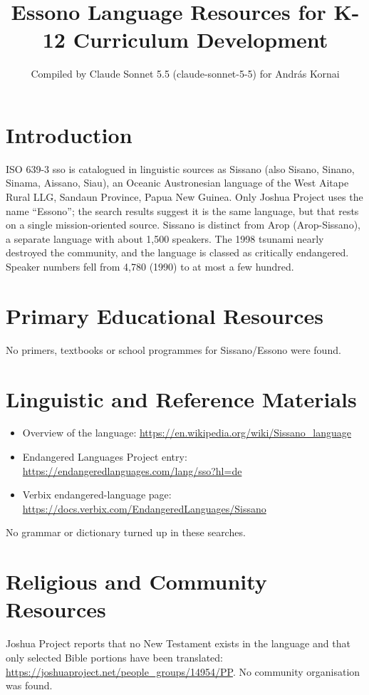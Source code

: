 \documentclass[12pt]{article}
\title{Essono Language Resources for K-12 Curriculum Development}
\author{Compiled by Claude Sonnet 5.5 (claude-sonnet-5-5) for Andr\'as Kornai}
\date{}
\begin{document}
\maketitle

\section{Introduction}
ISO 639-3 sso is catalogued in linguistic sources as Sissano (also Sisano, Sinano, Sinama, Aissano, Siau), an Oceanic Austronesian language of the West Aitape Rural LLG, Sandaun Province, Papua New Guinea. Only Joshua Project uses the name ``Essono''; the search results suggest it is the same language, but that rests on a single mission-oriented source. Sissano is distinct from Arop (Arop-Sissano), a separate language with about 1,500 speakers. The 1998 tsunami nearly destroyed the community, and the language is classed as critically endangered. Speaker numbers fell from 4,780 (1990) to at most a few hundred.

\section{Primary Educational Resources}
No primers, textbooks or school programmes for Sissano/Essono were found.

\section{Linguistic and Reference Materials}
\begin{itemize}
\item Overview of the language: \url{https://en.wikipedia.org/wiki/Sissano_language}
\item Endangered Languages Project entry: \url{https://endangeredlanguages.com/lang/sso?hl=de}
\item Verbix endangered-language page: \url{https://docs.verbix.com/EndangeredLanguages/Sissano}
\end{itemize}
No grammar or dictionary turned up in these searches.

\section{Religious and Community Resources}
Joshua Project reports that no New Testament exists in the language and that only selected Bible portions have been translated: \url{https://joshuaproject.net/people_groups/14954/PP}. No community organisation was found.
\end{document}
